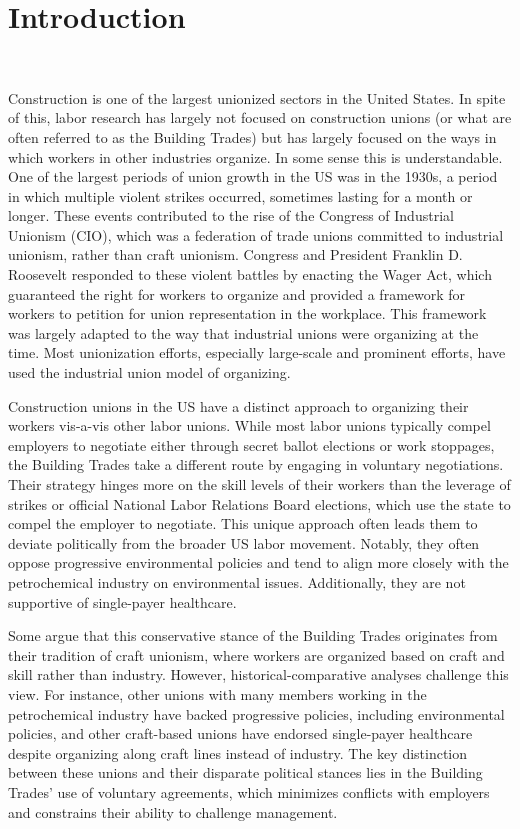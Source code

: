 \tableofcontents
\newpage


\section{Introduction} \

Construction is one of the largest unionized sectors in the United States. In spite of this, labor research has largely not focused on construction unions (or what are often referred to as the Building Trades) but has largely focused on the ways in which workers in other industries organize. In some sense this is understandable. One of the largest periods of union growth in the US was in the 1930s, a period in which multiple violent strikes occurred, sometimes lasting for a month or longer. These events contributed to the rise of the Congress of Industrial Unionism (CIO), which was a federation of trade unions committed to industrial unionism, rather than craft unionism. Congress and President Franklin D. Roosevelt responded to these violent battles by enacting the Wager Act, which guaranteed the right for workers to organize and provided a framework for workers to petition for union representation in the workplace. This framework was largely adapted to the way that industrial unions were organizing at the time. Most unionization efforts, especially large-scale and prominent efforts, have used the industrial union model of organizing.

Construction unions in the US have a distinct approach to organizing their workers vis-a-vis other labor unions. While most labor unions typically compel employers to negotiate either through secret ballot elections or work stoppages, the Building Trades take a different route by engaging in voluntary negotiations. Their strategy hinges more on the skill levels of their workers than the leverage of strikes or official National Labor Relations Board elections, which use the state to compel the employer to negotiate. This unique approach often leads them to deviate politically from the broader US labor movement. Notably, they often oppose progressive environmental policies and tend to align more closely with the petrochemical industry on environmental issues. Additionally, they are not supportive of single-payer healthcare.

Some argue that this conservative stance of the Building Trades originates from their tradition of craft unionism, where workers are organized based on craft and skill rather than industry. However, historical-comparative analyses challenge this view. For instance, other unions with many members working in the petrochemical industry have backed progressive policies, including environmental policies, and other craft-based unions have endorsed single-payer healthcare despite organizing along craft lines instead of industry. The key distinction between these unions and their disparate political stances lies in the Building Trades' use of voluntary agreements, which minimizes conflicts with employers and constrains their ability to challenge management.


